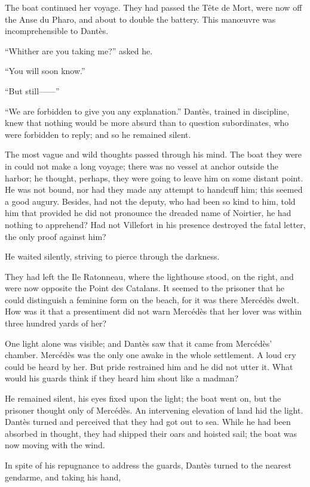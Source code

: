 The boat continued her voyage. They had passed the Tête de Mort, were
now off the Anse du Pharo, and about to double the battery. This
manœuvre was incomprehensible to Dantès.

“Whither are you taking me?” asked he.

“You will soon know.”

“But still——”

“We are forbidden to give you any explanation.” Dantès, trained in
discipline, knew that nothing would be more absurd than to question
subordinates, who were forbidden to reply; and so he remained silent.

The most vague and wild thoughts passed through his mind. The boat they
were in could not make a long voyage; there was no vessel at anchor
outside the harbor; he thought, perhaps, they were going to leave him
on some distant point. He was not bound, nor had they made any attempt
to handcuff him; this seemed a good augury. Besides, had not the
deputy, who had been so kind to him, told him that provided he did not
pronounce the dreaded name of Noirtier, he had nothing to apprehend?
Had not Villefort in his presence destroyed the fatal letter, the only
proof against him?

He waited silently, striving to pierce through the darkness.

They had left the Ile Ratonneau, where the lighthouse stood, on the
right, and were now opposite the Point des Catalans. It seemed to the
prisoner that he could distinguish a feminine form on the beach, for it
was there Mercédès dwelt. How was it that a presentiment did not warn
Mercédès that her lover was within three hundred yards of her?

One light alone was visible; and Dantès saw that it came from Mercédès’
chamber. Mercédès was the only one awake in the whole settlement. A
loud cry could be heard by her. But pride restrained him and he did not
utter it. What would his guards think if they heard him shout like a
madman?

He remained silent, his eyes fixed upon the light; the boat went on,
but the prisoner thought only of Mercédès. An intervening elevation of
land hid the light. Dantès turned and perceived that they had got out
to sea. While he had been absorbed in thought, they had shipped their
oars and hoisted sail; the boat was now moving with the wind.

In spite of his repugnance to address the guards, Dantès turned to the
nearest gendarme, and taking his hand,

